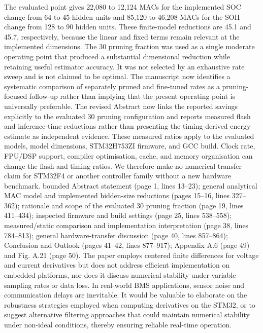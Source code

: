 {}The evaluated  point gives 22,080 to 12,124 MACs for the implemented SOC change from 64 to 45 hidden units and 85,120 to 46,208 MACs for the SOH change from 128 to 90 hidden units. These finite-model reductions are 45.1\markdownRendererPercentSign{} and 45.7\markdownRendererPercentSign{}, respectively, because the linear and fixed terms remain relevant at the implemented dimensions. The 30\markdownRendererPercentSign{} pruning fraction was used as a single moderate operating point that produced a substantial dimensional reduction while retaining useful estimator accuracy. It was not selected by an exhaustive rate sweep and is not claimed to be optimal. The manuscript now identifies a systematic comparison of separately pruned and fine-tuned rates as a pruning-focused follow-up rather than implying that the present operating point is universally preferable.\markdownRendererParagraphSeparator
{}The revised Abstract now links the reported savings explicitly to the evaluated 30\markdownRendererPercentSign{} pruning configuration and reports measured flash and inference-time reductions rather than presenting the timing-derived energy estimate as independent evidence. These measured ratios apply to the evaluated models, model dimensions, STM32H753ZI firmware, and GCC  build. Clock rate, FPU/DSP support, compiler optimisation, cache, and memory organisation can change the flash and timing ratios. We therefore make no numerical transfer claim for STM32F4 or another controller family without a new hardware benchmark.\markdownRendererParagraphSeparator
{} bounded Abstract statement (page 1, lines 13--23); general analytical MAC model and implemented hidden-size reductions (pages 15--16, lines 327--362); rationale and scope of the evaluated 30\markdownRendererPercentSign{} pruning fraction (page 19, lines 411--434); inspected firmware and build settings (page 25, lines 538--558); measured/static comparison and implementation interpretation (page 38, lines 784--813); general hardware-transfer discussion (page 40, lines 857--864); Conclusion and Outlook (pages 41--42, lines 877--917); Appendix A.6 (page 49) and Fig. A.21 (page 50).\markdownRendererInterblockSeparator
{}
\markdownRendererSectionEnd \markdownRendererSectionBegin
{}\markdownRendererInterblockSeparator
{}\markdownRendererBlockQuoteBegin
The paper employs centered finite differences for voltage and current derivatives but does not address efficient implementation on embedded platforms, nor does it discuss numerical stability under variable sampling rates or data loss. In real-world BMS applications, sensor noise and communication delays are inevitable. It would be valuable to elaborate on the robustness strategies employed when computing derivatives on the STM32, or to suggest alternative filtering approaches that could maintain numerical stability under non-ideal conditions, thereby ensuring reliable real-time operation.\markdownRendererBlockQuoteEnd \markdownRendererInterblockSeparator
